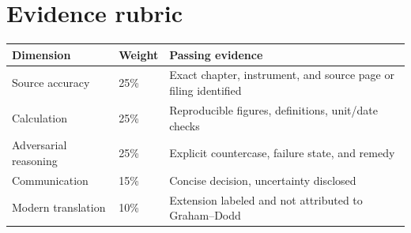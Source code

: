 \documentclass[11pt,letterpaper]{article}
\begin{document}
\section{Evidence rubric}
\begin{center}\begin{tabularx}{\textwidth}{p{}p{}X}\toprule Dimension & Weight & Passing evidence \\
\midrule Source accuracy & 25\% & Exact chapter, instrument, and source page or filing identified \\
Calculation & 25\% & Reproducible figures, definitions, unit/date checks \\
Adversarial reasoning & 25\% & Explicit countercase, failure state, and remedy \\
Communication & 15\% & Concise decision, uncertainty disclosed \\
Modern translation & 10\% & Extension labeled and not attributed to Graham--Dodd \\
\bottomrule\end{tabularx}\end{center}
\end{document}

